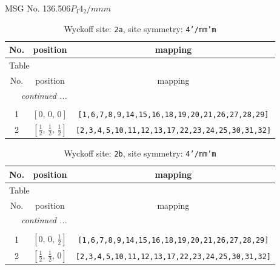 \documentclass[fleqn,8pt]{jsarticle}
\begin{document}
\setcounter{MaxMatrixCols}{32}

\renewcommand{\tablename}{Table~}
\renewcommand{\figurename}{Figure~}
\begin{center}
\LARGE
MSG No. 136.506\quad$P_{I}4_{2}/mnm$
\end{center}
\renewcommand{\arraystretch}{1.2}
\begin{longtable}{ccc}
\caption{Wyckoff site: {\tt 2a}, site symmetry: {\tt 4'/mm'm}}
 \\
 \hline \hline
No. & position & mapping \\ \hline \endfirsthead

\multicolumn{2}{l}{\tablename\ \thetable{}} \\
 \hline \hline
No. & position & mapping \\ \hline \endhead

 \hline \hline
\multicolumn{2}{r}{\footnotesize\it continued ...} \\ \endfoot

 \hline \hline
\multicolumn{2}{r}{} \\ \endlastfoot

1 & $\left[ 0,\, 0,\, 0 \right]$ & {\tt [1,6,7,8,9,14,15,16,18,19,20,21,26,27,28,29]} \\ \hline
2 & $\left[ \frac{1}{2},\, \frac{1}{2},\, \frac{1}{2} \right]$ & {\tt [2,3,4,5,10,11,12,13,17,22,23,24,25,30,31,32]} \\
\end{longtable}
\renewcommand{\arraystretch}{1.2}
\begin{longtable}{ccc}
\caption{Wyckoff site: {\tt 2b}, site symmetry: {\tt 4'/mm'm}}
 \\
 \hline \hline
No. & position & mapping \\ \hline \endfirsthead

\multicolumn{2}{l}{\tablename\ \thetable{}} \\
 \hline \hline
No. & position & mapping \\ \hline \endhead

 \hline \hline
\multicolumn{2}{r}{\footnotesize\it continued ...} \\ \endfoot

 \hline \hline
\multicolumn{2}{r}{} \\ \endlastfoot

1 & $\left[ 0,\, 0,\, \frac{1}{2} \right]$ & {\tt [1,6,7,8,9,14,15,16,18,19,20,21,26,27,28,29]} \\ \hline
2 & $\left[ \frac{1}{2},\, \frac{1}{2},\, 0 \right]$ & {\tt [2,3,4,5,10,11,12,13,17,22,23,24,25,30,31,32]} \\
\end{longtable}
\end{document}
